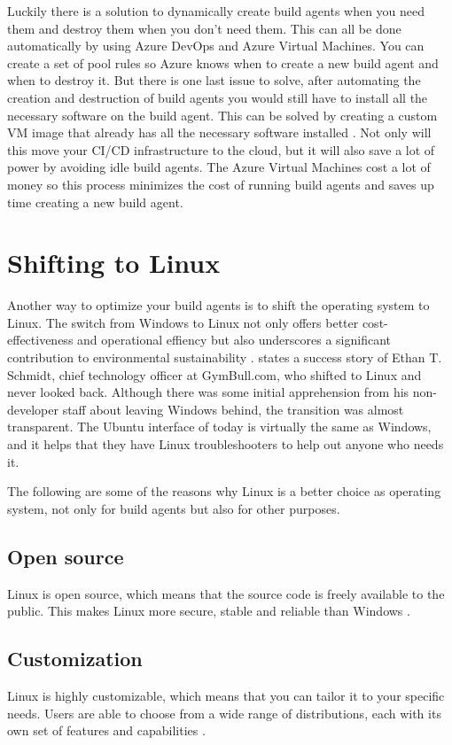 Luckily there is a solution to dynamically create build agents when you need them and destroy them when you don't need them.
This can all be done automatically by using Azure DevOps and Azure Virtual Machines. You can create a set of pool rules so Azure knows when to create a new build agent and when to destroy it.
But there is one last issue to solve, after automating the creation and destruction of build agents you would still have to install all the necessary software on the build agent.
This can be solved by creating a custom VM image that already has all the necessary software installed \autocite{Keiholz2023}.
Not only will this move your CI/CD infrastructure to the cloud, but it will also save a lot of power by avoiding idle build agents.
The Azure Virtual Machines cost a lot of money so this process minimizes the cost of running build agents and saves up time creating a new build agent.



\section{Shifting to Linux}
Another way to optimize your build agents is to shift the operating system to Linux. 
The switch from Windows to Linux not only offers better cost-effectiveness and operational effiency but also underscores a significant contribution to environmental sustainability \autocite{Germain2017}.
\textcite{Germain2017} states a success story of Ethan T. Schmidt, chief technology officer at GymBull.com, who shifted to Linux and never looked back.
Although there was some initial apprehension from his non-developer staff about leaving Windows behind, the transition was almost transparent. 
The Ubuntu interface of today is virtually the same as Windows, and it helps that they have Linux troubleshooters to help out anyone who needs it. 

The following are some of the reasons why Linux is a better choice as operating system, not only for build agents but also for other purposes.


\subsection{Open source}
Linux is open source, which means that the source code is freely available to the public. 
This makes Linux more secure, stable and reliable than Windows \autocite{Singh2023}.


\subsection{Customization}
Linux is highly customizable, which means that you can tailor it to your specific needs. 
Users are able to choose from a wide range of distributions, each with its own set of features and capabilities \autocite{Singh2023}.


